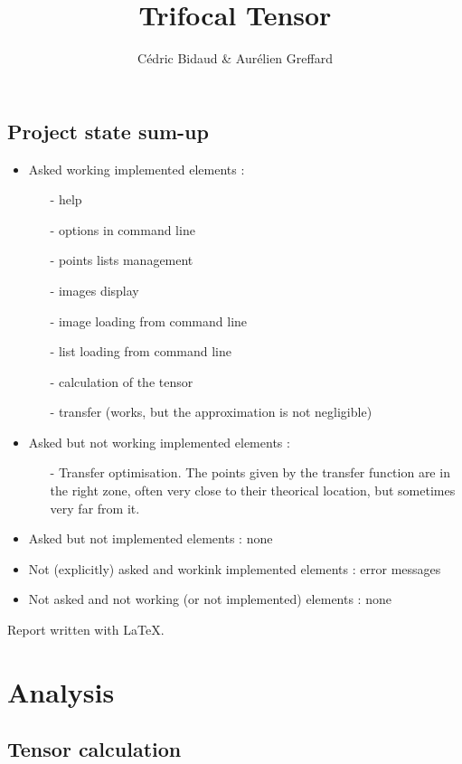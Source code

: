 \documentclass[a4paper,10pt]{report}
\title{Trifocal Tensor}
\author{Cédric Bidaud & Aurélien Greffard}
\begin{document}
\maketitle

\section*{Project state sum-up}

\begin{itemize}
 \item Asked working implemented elements :
 \begin{itemize}
   \item[-] help
   \item[-] options in command line
   \item[-] points lists management
   \item[-] images display
   \item[-] image loading from command line
   \item[-] list loading from command line
   \item[-] calculation of the tensor
   \item[-] transfer (works, but the approximation is not negligible)
 \end{itemize}
 \item Asked but not working implemented elements :
 \begin{itemize}
  \item[-] Transfer optimisation. The points given by the transfer function are in the 
  right zone, often very close to their theorical location, but sometimes very far from it.
 \end{itemize}
 \item Asked but not implemented elements : none
 \item Not (explicitly) asked and workink implemented elements : error messages
 \item Not asked and not working (or not implemented) elements : none
\end{itemize}

Report written with LaTeX.


\chapter{Analysis}
\section{Tensor calculation}
\end{document}

